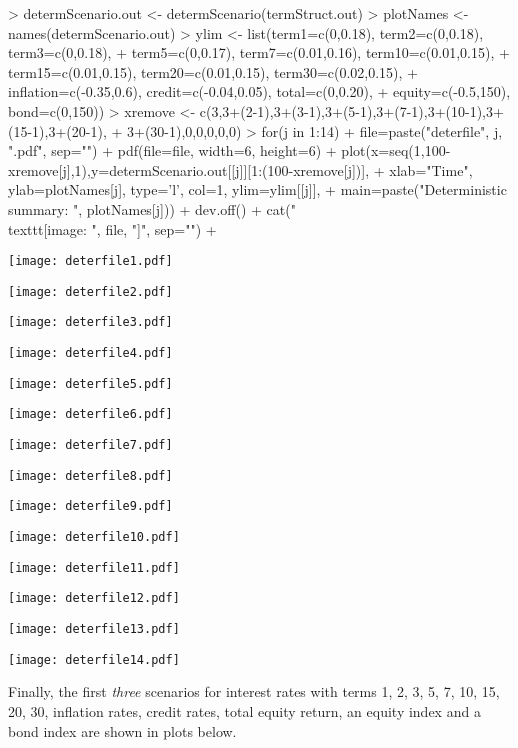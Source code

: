 \documentclass[12pt]{article}
\begin{document}
\begin{Schunk}
\begin{Sinput}
> determScenario.out <- determScenario(termStruct.out)
> plotNames <- names(determScenario.out)
> ylim <- list(term1=c(0,0.18), term2=c(0,0.18), term3=c(0,0.18), 
+   term5=c(0,0.17), term7=c(0.01,0.16), term10=c(0.01,0.15), 
+   term15=c(0.01,0.15), term20=c(0.01,0.15), term30=c(0.02,0.15),
+   inflation=c(-0.35,0.6), credit=c(-0.04,0.05), total=c(0,0.20), 
+   equity=c(-0.5,150), bond=c(0,150))
> xremove <- c(3,3+(2-1),3+(3-1),3+(5-1),3+(7-1),3+(10-1),3+(15-1),3+(20-1),
+   3+(30-1),0,0,0,0,0)
> for(j in 1:14) {
+   file=paste("deterfile", j, ".pdf", sep="")  
+   pdf(file=file, width=6, height=6)  
+   plot(x=seq(1,100-xremove[j],1),y=determScenario.out[[j]][1:(100-xremove[j])],
+     xlab="Time", ylab=plotNames[j], type='l', col=1, ylim=ylim[[j]], 
+     main=paste("Deterministic summary: ", plotNames[j]))
+   dev.off()  
+   cat("\\texttt{[image: ", file, "]}\n\n", sep="")  
+ }
\end{Sinput}
\texttt{[image: deterfile1.pdf]}

\texttt{[image: deterfile2.pdf]}

\texttt{[image: deterfile3.pdf]}

\texttt{[image: deterfile4.pdf]}

\texttt{[image: deterfile5.pdf]}

\texttt{[image: deterfile6.pdf]}

\texttt{[image: deterfile7.pdf]}

\texttt{[image: deterfile8.pdf]}

\texttt{[image: deterfile9.pdf]}

\texttt{[image: deterfile10.pdf]}

\texttt{[image: deterfile11.pdf]}

\texttt{[image: deterfile12.pdf]}

\texttt{[image: deterfile13.pdf]}

\texttt{[image: deterfile14.pdf]}\end{Schunk}

Finally, the first \textit{three} scenarios for interest rates with terms 1, 2, 3, 
5, 7, 10, 15, 20, 30, inflation rates, credit rates, total equity return,
an equity index and a bond index are shown in plots below.
\end{document}
